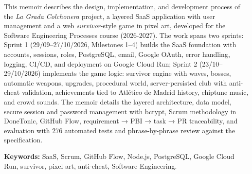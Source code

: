 This memoir describes the design, implementation, and development process of the \textit{La Grada Colchonera} project, a layered SaaS application with user management and a web \textit{survivor}-style game in pixel art, developed for the Software Engineering Processes course (2026-2027). The work spans two sprints: Sprint 1 (29/09–27/10/2026, Milestones 1–4) builds the SaaS foundation with accounts, sessions, roles, PostgreSQL, email, Google OAuth, error handling, logging, CI/CD, and deployment on Google Cloud Run; Sprint 2 (23/10–29/10/2026) implements the game logic: survivor engine with waves, bosses, automatic weapons, upgrades, procedural world, server-persisted club with anti-cheat validation, achievements tied to Atlético de Madrid history, chiptune music, and crowd sounds. The memoir details the layered architecture, data model, secure session and password management with bcrypt, Scrum methodology in DoneTonic, GitHub Flow, requirement → PBI → task → PR traceability, and evaluation with 276 automated tests and phrase-by-phrase review against the specification.

\medskip
\noindent\textbf{Keywords:} SaaS, Scrum, GitHub Flow, Node.js, PostgreSQL, Google Cloud Run, survivor, pixel art, anti-cheat, Software Engineering.
